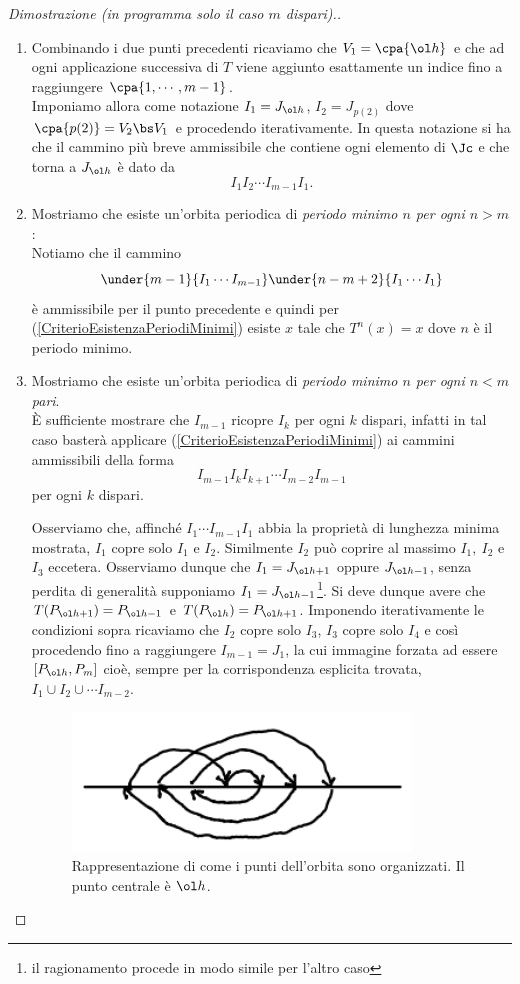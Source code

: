 \begin{proof}[Dimostrazione (in programma solo il caso $m$ dispari).]
\begin{enumerate}
\item Combinando i due punti precedenti ricaviamo che $V_1=\cpa{\ol h}$ e che ad ogni applicazione successiva di $T$ viene aggiunto esattamente un indice fino a raggiungere $\cpa{1,\cdots, m-1}$.\\
Imponiamo allora come notazione $I_1=J_{\ol h}$, $I_2=J_{p(2)}$ dove $\cpa{p(2)}=V_2\bs V_1$ e procedendo iterativamente. In questa notazione si ha che il cammino pi\`u breve ammissibile che contiene ogni elemento di $\Jc$ e che torna a $J_{\ol h}$ \`e dato da
\[I_1I_2\cdots I_{m-1}I_1.\]

\item Mostriamo che esiste un'orbita periodica di \textit{periodo minimo $n$ per ogni $n>m$}:\\
Notiamo che il cammino
\[\under{m-1}{I_1\cdots I_{m-1}}\under{n-m+2}{I_1\cdots I_1}\]
\`e ammissibile per il punto precedente e quindi per (\ref{CriterioEsistenzaPeriodiMinimi}) esiste $x$ tale che $T^{n}(x)=x$ dove $n$ \`e il periodo minimo.

\item Mostriamo che esiste un'orbita periodica di \textit{periodo minimo $n$ per ogni $n<m$ pari}.\\
\`E sufficiente mostrare che $I_{m-1}$ ricopre $I_k$ per ogni $k$ dispari, infatti in tal caso baster\`a applicare (\ref{CriterioEsistenzaPeriodiMinimi}) ai cammini ammissibili della forma
\[I_{m-1}I_k I_{k+1}\cdots I_{m-2}I_{m-1}\]
per ogni $k$ dispari.

Osserviamo che, affinch\'e $I_1\cdots I_{m-1}I_1$ abbia la propriet\`a di lunghezza minima mostrata, $I_1$ copre solo $I_1$ e $I_2$. Similmente $I_2$ pu\`o coprire al massimo $I_1,\ I_2$ e $I_3$ eccetera. Osserviamo dunque che $I_1=J_{\ol h+1}$ oppure $J_{\ol h-1}$, senza perdita di generalit\`a supponiamo $I_1=J_{\ol h-1}$\footnote{il ragionamento procede in modo simile per l'altro caso}. Si deve dunque avere che $T(P_{\ol h+1})=P_{\ol h-1}$ e $T(P_{\ol h})=P_{\ol h+1}$. Imponendo iterativamente le condizioni sopra ricaviamo che $I_2$ copre solo $I_3$, $I_3$ copre solo $I_4$ e cos\`i procedendo fino a raggiungere $I_{m-1}=J_{1}$, la cui immagine forzata ad essere $[P_{\ol h},P_m]$ cio\`e, sempre per la corrispondenza esplicita trovata, $I_1\cup I_2\cup \cdots I_{m-2}$.

\begin{figure}[!htb]
	\centering
	\includegraphics[width=9cm]{Immagini/Disegno_A.png}
	\caption{Rappresentazione di come i punti dell'orbita sono organizzati. Il punto centrale \`e $\ol h$.}
	\label{ConfigurazioneOrbita}
\end{figure}



\end{enumerate}
\end{proof}
